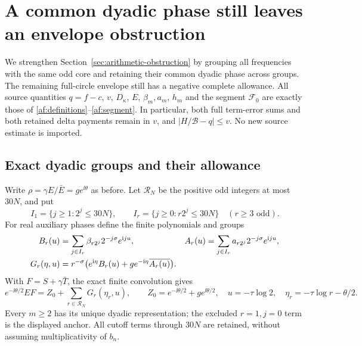 \section{A common dyadic phase still leaves an envelope obstruction}
\label{sec:dyadic-group-obstruction}

We strengthen Section~\ref{sec:arithmetic-obstruction} by grouping all
frequencies with the same odd core and retaining their common dyadic
phase across groups. The remaining full-circle envelope still has a
negative complete allowance. All source quantities $q=f-c$, $v$,
$D_\kappa$, $E$, $\beta_m,a_m$, $h_m$ and the segment $\mathcal F_0$
are exactly those of \eqref{af:definitions}--\eqref{af:segment}.
In particular, both full term-error sums and both retained delta payments
remain in $v$, and $|H/\mathcal B-q|\le v$. No new source estimate is
imported.

\subsection{Exact dyadic groups and their allowance}

Write $\rho=\gamma E/\bar E=g e^{\ii\theta}$ as before. Let
$\mathcal R_N$ be the positive odd integers at most $30N$, and put
\[
 I_1=\{j\ge1:2^j\le30N\},\qquad
 I_r=\{j\ge0:r2^j\le30N\}\quad(r\ge3\text{ odd}).
\]
For real auxiliary phases define the finite polynomials and groups
\begin{align}
 B_r(u)&=\sum_{j\in I_r}\beta_{r2^j}2^{-j\sigma}e^{\mathrm i ju},&
 A_r(u)&=\sum_{j\in I_r}a_{r2^j}2^{-j\sigma}e^{\mathrm i ju},\notag\\
 G_r(\eta,u)&=r^{-\sigma}
    \bigl(e^{\mathrm i\eta}B_r(u)+g e^{-\mathrm i\eta}\overline{A_r(u)}\bigr).
 \label{dg:groups}
\end{align}
With $F=S+\gamma\bar T$, the exact finite convolution gives
\begin{equation}
 e^{-\ii\theta/2}EF=Z_0+
 \sum_{r\in\mathcal R_N}G_r(\eta_r,u),\qquad
 Z_0=e^{-\ii\theta/2}+g e^{\ii\theta/2},\quad
 u=-\tau\log2,\quad\eta_r=-\tau\log r-\theta/2.
 \label{dg:identity}
\end{equation}
Every $m\ge2$ has its unique dyadic representation; the excluded
$r=1,j=0$ term is the displayed anchor. All cutoff terms through $30N$
are retained, without assuming multiplicativity of $b_n$.

